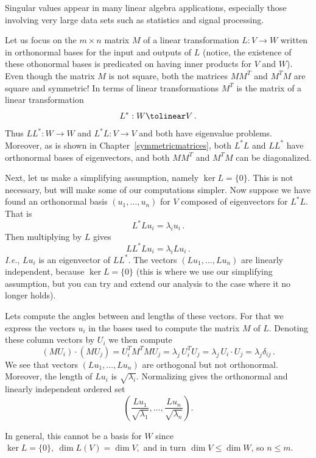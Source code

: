 Singular values appear in many linear algebra applications, especially those involving very large data sets such as statistics and signal processing. 

Let us focus on the $m\times n$ matrix $M$ of a linear transformation $L:V\to W$ written in orthonormal bases for the input and outputs of $L$ (notice, the existence of these othonormal bases is predicated on having inner products for $V$ and $W$).
Even though the matrix $M$ is not square, both the matrices $M M^T$ and $M^T M$ are square and symmetric! 
In terms of linear transformations $M^T$ is the matrix of a linear transformation 
\[
L^*:W\tolinear V\, .
\]
Thus $LL^*:W\to W$ and $L^*L:V\to V$ and both have eigenvalue problems.
Moreover,  as is shown  in Chapter~\ref{symmetricmatrices},  both $L^*L$ and $LL^*$ have orthonormal bases of eigenvectors, and
 both $MM^T$ and $M^TM$ can be diagonalized. 
 
Next, let us make a simplifying assumption, namely $\ker L=\{0\}$. This is not necessary, but will make some of our computations simpler.
Now suppose we have found an orthonormal basis $(u_1,\ldots , u_n)$ for $V$ composed of eigenvectors for $L^*L$. That is 
\[
L^*L u_i= \lambda_i u_i\, .
\]
Then multiplying by $L$ gives 
\[
L L^* L u_i = \lambda_i L u_i\, .
\]
{\itshape I.e.}, $L u_i$ is an eigenvector of $L L^*$.
The vectors $(Lu_1,\ldots, Lu_n)$ are linearly independent, because $\ker L=\{0\}$ (this is where we use our simplifying assumption, but you can 
try and extend our analysis to the case where it no longer holds). 

Lets compute the angles between and lengths of these vectors. 
For that we express the vectors $u_i$ in the bases used to compute the matrix $M$ of $L$. Denoting these column vectors by $U_i$ we then compute
\[
(MU_i)\cdot (MU_j)=U_i^T M^T M U_j = \lambda_j \, U_i^T U_j=\lambda_j \, U_i\cdot U_j = \lambda_j \delta_{ij}\, .
\]
We see that  vectors $(Lu_1,\ldots, Lu_n)$ are orthogonal but not orthonormal. Moreover, the length of $Lu_i$ is $\sqrt{\lambda_i}$.
Normalizing gives the orthonormal and linearly independent ordered set
\[
\left(\frac{Lu_1}{\sqrt{\lambda_1}},\ldots,\frac{Lu_n}{\sqrt{\lambda_n}}\right).
\]

In general, this cannot be a basis for $W$ 
since $\ker L=\{0\},~\dim L(V)=\dim V,$
and in turn $\dim V\leq \dim W$, so $n\leq m$. 

